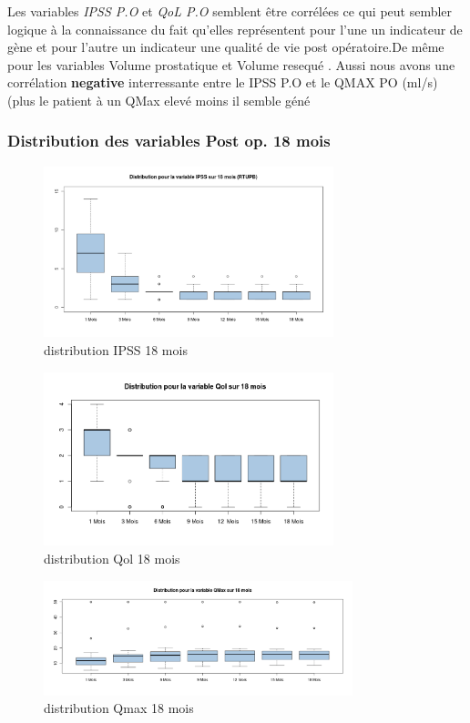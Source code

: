 Les variables  \emph{IPSS P.O} et   \emph{QoL P.O}  semblent être corrélées ce qui peut sembler logique à la connaissance du fait 
qu’elles représentent pour l’une un indicateur de gène et pour l’autre un indicateur une qualité de vie post opératoire.De même  pour les variables Volume prostatique et Volume resequé . Aussi nous avons une corrélation \textbf{negative} interressante entre le IPSS P.O et le QMAX PO (ml/s) (plus le patient à un QMax elevé moins il semble géné
\newpage 

\subsubsection{Distribution des variables Post op. 18 mois}

\begin{figure}[!h]
\centering
\includegraphics[width=0.75\textwidth]{../Fig/RTUPB//rtupb-boxplot-post-ipss}
\caption{distribution IPSS 18 mois}
\end{figure}


\begin{figure}[!h]
\centering
\includegraphics[width=0.75\textwidth]{../Fig/RTUPB//rtupb-boxplot-post-Qol}
\caption{distribution Qol 18 mois}
\end{figure}

\begin{figure}[!h]
\centering
\includegraphics[width=0.80\textwidth]{../Fig/RTUPB//rtupb-boxplot-post-Qmax}
\caption{distribution Qmax 18 mois}
\end{figure}


